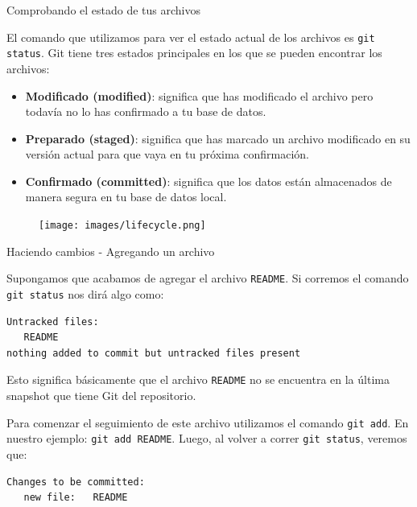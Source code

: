 \documentclass{beamer}
\begin{document}
\begin{frame}{Comprobando el estado de tus archivos}

    El comando que utilizamos para ver el estado actual de los archivos es \texttt{git status}.
    Git tiene tres estados principales en los que se pueden encontrar los archivos:

    \begin{itemize}
        \item \textbf{Modificado (modified)}: significa que has modificado el archivo pero todavía no lo has confirmado a tu base de datos.
        \item \textbf{Preparado (staged)}: significa que has marcado un archivo modificado en su versión actual para que vaya en tu próxima confirmación.
        \item \textbf{Confirmado (committed)}: significa que los datos están almacenados de manera segura en tu base de datos local.
    \end{itemize}

    \begin{figure}[ht]
        \begin{center}
            \texttt{[image: images/lifecycle.png]}
        \end{center}
    \end{figure}

\end{frame}

\begin{frame}[fragile]{Haciendo cambios - Agregando un archivo}

    Supongamos que acabamos de agregar el archivo \texttt{README}.
    Si corremos el comando \texttt{git status} nos dirá algo como:
    \begin{verbatim}
Untracked files:
   README
nothing added to commit but untracked files present
    \end{verbatim}
    Esto significa básicamente que el archivo \texttt{README} no se encuentra
    en la última snapshot que tiene Git del repositorio.

    Para comenzar el seguimiento de este archivo utilizamos el comando \texttt{git add}. En nuestro ejemplo: \texttt{git add README}.
    Luego, al volver a correr \texttt{git status}, veremos que:
    \begin{verbatim}
Changes to be committed:
   new file:   README
    \end{verbatim}

\end{frame}
\end{document}
